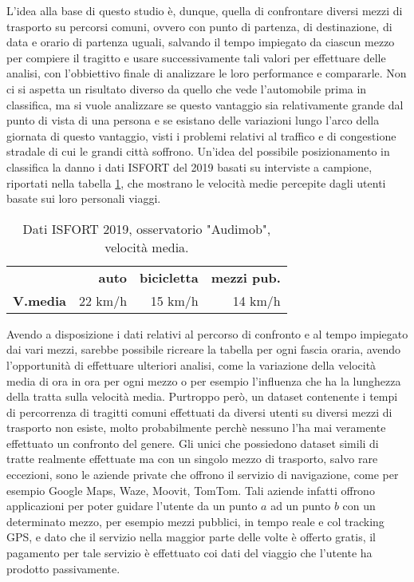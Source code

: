 L'idea alla base di questo studio è, dunque, quella di confrontare diversi mezzi di trasporto su percorsi comuni, ovvero con punto di partenza, di destinazione, di data e orario di partenza uguali, salvando il tempo impiegato da ciascun mezzo per compiere il tragitto e usare successivamente tali valori per effettuare delle analisi, con l'obbiettivo finale di analizzare le loro performance e compararle. Non ci si aspetta un risultato diverso da quello che vede l'automobile prima in classifica, ma si vuole analizzare se questo vantaggio sia relativamente grande dal punto di vista di una persona e se esistano delle variazioni lungo l'arco della giornata di questo vantaggio, visti i problemi relativi al traffico e di congestione stradale di cui le grandi città soffrono. Un'idea del possibile posizionamento in classifica la danno i dati ISFORT del 2019 basati su interviste a campione, riportati nella tabella \ref{table:9}, che mostrano le velocità medie percepite dagli utenti basate sui loro personali viaggi\cite{isfortaudimob}.

\begin{table}[H]
	\centering
	\begin{tabular}{ | l  r  r r | }
		\hline
		& \textbf{auto} & \textbf{bicicletta} & \textbf{mezzi pub.} \\
		\textbf{V.media} & 22 km/h & 15 km/h & 14 km/h \\
		\hline
	\end{tabular}
	\caption{Dati ISFORT 2019, osservatorio "Audimob", velocità media.}
	\label{table:9}
\end{table}

Avendo a disposizione i dati relativi al percorso di confronto e al tempo impiegato dai vari mezzi, sarebbe possibile ricreare la tabella per ogni fascia oraria, avendo l'opportunità di effettuare ulteriori analisi, come la variazione della velocità media di ora in ora per ogni mezzo o per esempio l'influenza che ha la lunghezza della tratta sulla velocità media. Purtroppo però, un dataset contenente i tempi di percorrenza di tragitti comuni effettuati da diversi utenti su diversi mezzi di trasporto non esiste, molto probabilmente perchè nessuno l'ha mai veramente effettuato un confronto del genere. Gli unici che possiedono dataset simili di tratte realmente effettuate ma con un singolo mezzo di trasporto, salvo rare eccezioni, sono le aziende private che offrono il servizio di navigazione, come per esempio Google Maps, Waze, Moovit, TomTom. Tali aziende infatti offrono applicazioni per poter guidare l'utente da un punto $a$ ad un punto $b$ con un determinato mezzo, per esempio mezzi pubblici, in tempo reale e col tracking GPS, e dato che il servizio nella maggior parte delle volte è offerto gratis, il pagamento per tale servizio è effettuato coi dati del viaggio che l'utente ha prodotto passivamente.

